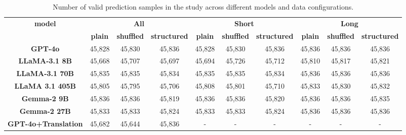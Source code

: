 \begin{table*}[]
\centering \small
\addtolength{\tabcolsep}{-1.2mm}
\begin{tabular}{@{}cccccccccc@{}}
\toprule
\multirow{2}{*}{\textbf{model}} & \multicolumn{3}{c}{\textbf{All}} & \multicolumn{3}{c}{\textbf{Short}} & \multicolumn{3}{c}{\textbf{Long}} \\ \cmidrule(lr){2-4} \cmidrule(lr){5-7} \cmidrule(lr){8-10}
 & \textbf{plain} & \textbf{shuffled} & \textbf{structured} & \textbf{plain} & \textbf{shuffled} & \textbf{structured} & \textbf{plain} & \textbf{shuffled} & \textbf{structured} \\ \midrule
\textbf{GPT-4o} & 45,828 & 45,830 & 45,836 & 45,828 & 45,830 & 45,836 & 45,836 & 45,836 & 45,836 \\
\textbf{LLaMA-3.1 8B} & 45,668 & 45,707 & 45,697 & 45,694 & 45,726 & 45,712 & 45,810 & 45,817 & 45,821 \\
\textbf{LLaMA-3.1 70B} & 45,835 & 45,835 & 45,834 & 45,835 & 45,835 & 45,834 & 45,836 & 45,836 & 45,836 \\
\textbf{LLaMA 3.1 405B} & 45,805 & 45,795 & 45,706 & 45,808 & 45,801 & 45,710 & 45,833 & 45,830 & 45,832 \\
\textbf{Gemma-2 9B} & 45,836 & 45,836 & 45,819 & 45,836 & 45,836 & 45,820 & 45,836 & 45,836 & 45,835 \\
\textbf{Gemma-2 27B} & 45,833 & 45,833 & 45,824 & 45,833 & 45,833 & 45,824 & 45,836 & 45,836 & 45,836 \\ \midrule
\textbf{GPT-4o+Translation} & 45,682 & 45,644 & 45,836 & - & - & - & - & - & - \\ \bottomrule
\end{tabular}
\addtolength{\tabcolsep}{+1.2mm}
\caption{Number of valid prediction samples in the study across different models and data configurations. }
\label{tab:valid-num-samples}
\end{table*}

